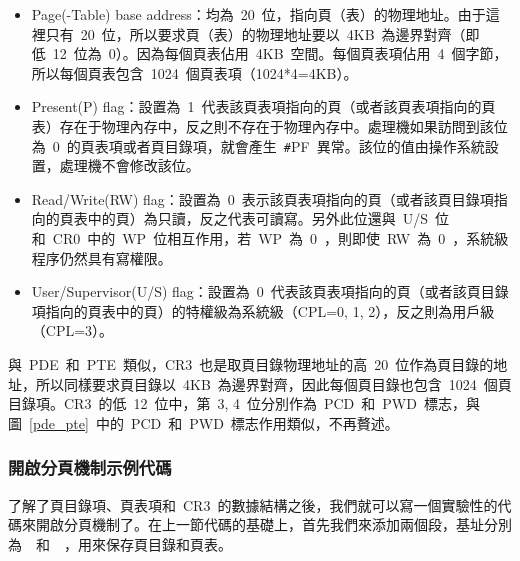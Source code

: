 
\begin{itemize}
\item Page(-Table) base address：均為~20~位，指向頁（表）的物理地址。由于這裡只有~20~位，所以要求頁（表）的物理地址要以~4KB~為邊界對齊（即低~12~位為~0）。因為每個頁表佔用~4KB~空間。每個頁表項佔用~4~個字節，所以每個頁表包含~1024~個頁表項（1024*4=4KB）。
\item Present(P) flag：設置為~1~代表該頁表項指向的頁（或者該頁表項指向的頁表）存在于物理內存中，反之則不存在于物理內存中。處理機如果訪問到該位為~0~的頁表項或者頁目錄項，就會產生~\texttt{\#}PF~異常。該位的值由操作系統設置，處理機不會修改該位。
\item Read/Write(RW) flag：設置為~0~表示該頁表項指向的頁（或者該頁目錄項指向的頁表中的頁）為只讀，反之代表可讀寫。另外此位還與~U/S~位和~CR0~中的~WP~位相互作用，若~WP~為~0~，則即使~RW~為~0~，系統級程序仍然具有寫權限。
\item User/Supervisor(U/S) flag：設置為~0~代表該頁表項指向的頁（或者該頁目錄項指向的頁表中的頁）的特權級為系統級（CPL=0, 1, 2），反之則為用戶級（CPL=3）。
\end{itemize}

與~PDE~和~PTE~類似，CR3~也是取頁目錄物理地址的高~20~位作為頁目錄的地址，所以同樣要求頁目錄以~4KB~為邊界對齊，因此每個頁目錄也包含~1024~個頁目錄項。CR3~的低~12~位中，第~3, 4~位分別作為~PCD~和~PWD~標志，與圖~\ref{pde_pte}~中的~PCD~和~PWD~標志作用類似，不再贅述。

\subsubsection{開啟分頁機制示例代碼}

了解了頁目錄項、頁表項和~CR3~的數據結構之後，我們就可以寫一個實驗性的代碼來開啟分頁機制了。在上一節代碼的基礎上，首先我們來添加兩個段，基址分別為~~和~~，用來保存頁目錄和頁表。


